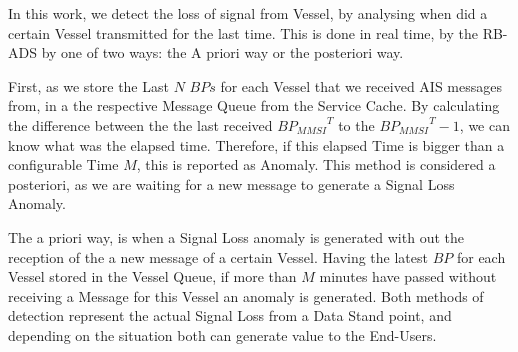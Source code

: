 In this work, we detect the loss of signal from Vessel, by analysing when did a certain Vessel transmitted for the last time. This is done in real time, by the RB-ADS by one of two ways: the A priori way or the posteriori way.

First, as we store the Last $N$ $BPs$ for each Vessel that we received AIS messages from, in a the respective Message Queue from the Service Cache. By calculating the difference between the the last received ${BP_{MMSI}}^T$ to the ${BP_{MMSI}}^T-1$, we can know what was the elapsed time. Therefore, if this elapsed Time is bigger than a configurable Time $M$, this is reported as Anomaly. This method is considered a posteriori, as we are waiting for a new message to generate a Signal Loss Anomaly.

The a priori way, is when a Signal Loss anomaly is generated with out the reception of the a new message of a certain Vessel. Having the latest $BP$ for each Vessel stored in the Vessel Queue, if more than $M$ minutes have passed without receiving a Message for this Vessel an anomaly is generated. Both methods of detection represent the actual Signal Loss from a Data Stand point, and depending on the situation both can generate value to the End-Users. 


